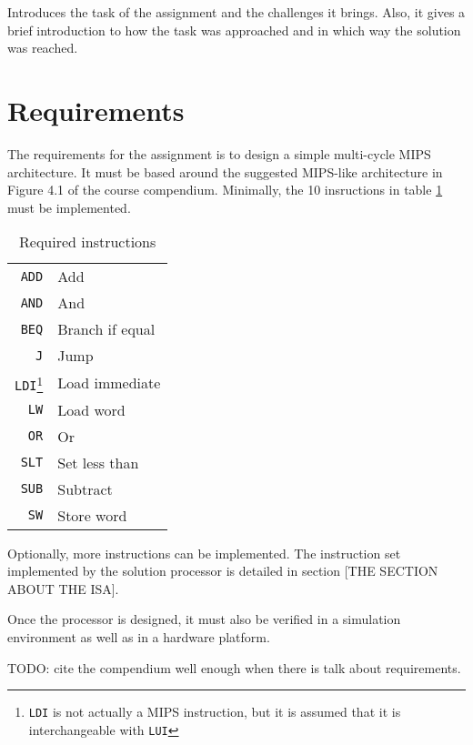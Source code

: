 Introduces the task of the assignment and the challenges it
brings.
Also, it gives a brief introduction to how the task was approached and in which way the solution was reached.

\section{Requirements}

The requirements for the assignment is to design a simple multi-cycle MIPS architecture.
It must be based around the suggested MIPS-like architecture in Figure 4.1 of the course compendium\cite{compendium}.
Minimally, the 10 insructions in table \ref{table:required-instructions} must be implemented.

\begin{table}
    \begin{center}
        \begin{tabular}{r|l}
            \texttt{ADD} & Add \\
            \texttt{AND} & And \\
            \texttt{BEQ} & Branch if equal \\
            \texttt{J} & Jump \\
            \texttt{LDI}\footnote{\texttt{LDI} is not actually a MIPS instruction, but it is assumed that it is interchangeable with \texttt{LUI}} & Load immediate \\
            \texttt{LW} & Load word \\
            \texttt{OR} & Or \\
            \texttt{SLT} & Set less than \\
            \texttt{SUB} & Subtract \\
            \texttt{SW} & Store word \\
            \hline
        \end{tabular}
        \smallskip
        \smallskip
        \caption{Required instructions}
        \label{table:required-instructions}
    \end{center}
\end{table}

Optionally, more instructions can be implemented.
The instruction set implemented by the solution processor is detailed in section [THE SECTION ABOUT THE ISA].

Once the processor is designed, it must also be verified in a simulation environment as well as in a hardware platform.

TODO: cite the compendium well enough when there is talk about requirements.

